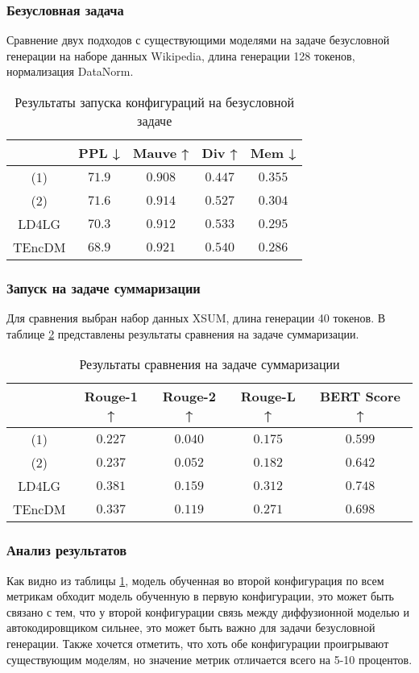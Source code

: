 \documentclass[12pt,a4paper]{article}
\begin{document}
\subsubsection{Безусловная задача}
Сравнение двух подходов с существующими моделями на задаче безусловной генерации на наборе данных Wikipedia, длина генерации 128 токенов, нормализация DataNorm.
\begin{table}[h!]
\centering
\begin{tabular}{|c|c|c|c|c|}
\hline
& PPL ↓ & Mauve ↑ & Div ↑ & Mem ↓ \\ \hline
(1) & $71.9$ & $0.908$ & $0.447$ & $0.355$ \\ \hline
(2) & $71.6$ & $0.914$ & $0.527$ & $0.304$ \\ \hline
LD4LG & $70.3$ & $0.912$ & $0.533$ & $0.295$ \\ \hline
TEncDM & $68.9$ & $0.921$ & $0.540$ & $0.286$ \\ \hline
\end{tabular}
\caption{Результаты запуска конфигураций на безусловной задаче}
\label{tab:wiki}
\end{table}

\subsubsection{Запуск на задаче суммаризации}
Для сравнения выбран набор данных XSUM, длина генерации 40 токенов.
В таблице \ref{tab:2} представлены результаты сравнения на задаче суммаризации.

\begin{table}[h!]
\centering
\begin{tabular}{|c|c|c|c|c||}
\hline
& Rouge-1 ↑ & Rouge-2 ↑ & Rouge-L ↑ & BERT Score ↑  \\ \hline
(1) &  $0.227$ & $0.040$ & $0.175$ & $0.599$ \\ \hline
(2) &  $0.237$ & $0.052$ & $0.182$ & $0.642$  \\ \hline
LD4LG & $0.381$ & $0.159$ & $0.312$ & $0.748$ \\ \hline
TEncDM &  $0.337$ & $0.119$ & $0.271$ & $0.698$ \\ \hline
\end{tabular}
\caption{Результаты сравнения на задаче суммаризации}
\label{tab:2}
\end{table}
\subsubsection{Анализ результатов}
Как видно из таблицы \ref{tab:wiki}, модель обученная во второй конфигурация по всем метрикам обходит модель обученную в первую конфигурации, это может быть связано с тем, что у второй конфигурации связь между диффузионной моделью и автокодировщиком сильнее, это может быть важно для задачи безусловной генерации. Также хочется отметить, что хоть обе конфигурации проигрывают существующим моделям, но значение метрик отличается всего на 5-10 процентов.
\end{document}
